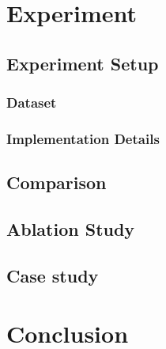 \documentclass[10pt,twocolumn,letterpaper]{article}
\begin{document}
\section{Experiment}

\subsection{Experiment Setup}

\subsubsection{Dataset}

\subsubsection{Implementation Details}

\subsection{Comparison}

\subsection{Ablation Study}

\subsection{Case study}

\section{Conclusion}


{\small


}
\end{document}
